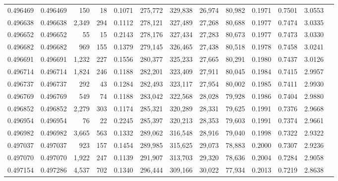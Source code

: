 \begin{tabular}{rrrrrrrrrrrrr}
0.496469 & 0.496469 &   150 &    18 &                                     0.1071 & 275,772 & 329,838 &  26,974 &  80,982 & 0.1971 & 0.7501 & 3.0553 \\
0.496638 & 0.496638 & 2,349 &   294 &                                     0.1112 & 278,121 & 327,489 &  27,268 &  80,688 & 0.1977 & 0.7474 & 3.0335 \\
0.496652 & 0.496652 &    55 &    15 &                                     0.2143 & 278,176 & 327,434 &  27,283 &  80,673 & 0.1977 & 0.7473 & 3.0330 \\
0.496682 & 0.496682 &   969 &   155 &                                     0.1379 & 279,145 & 326,465 &  27,438 &  80,518 & 0.1978 & 0.7458 & 3.0241 \\
0.496691 & 0.496691 & 1,232 &   227 &                                     0.1556 & 280,377 & 325,233 &  27,665 &  80,291 & 0.1980 & 0.7437 & 3.0126 \\
0.496714 & 0.496714 & 1,824 &   246 &                                     0.1188 & 282,201 & 323,409 &  27,911 &  80,045 & 0.1984 & 0.7415 & 2.9957 \\
0.496737 & 0.496737 &   292 &    43 &                                     0.1284 & 282,493 & 323,117 &  27,954 &  80,002 & 0.1985 & 0.7411 & 2.9930 \\
0.496769 & 0.496769 &   549 &    74 &                                     0.1188 & 283,042 & 322,568 &  28,028 &  79,928 & 0.1986 & 0.7404 & 2.9880 \\
0.496852 & 0.496852 & 2,279 &   303 &                                     0.1174 & 285,321 & 320,289 &  28,331 &  79,625 & 0.1991 & 0.7376 & 2.9668 \\
0.496954 & 0.496954 &    76 &    22 &                                     0.2245 & 285,397 & 320,213 &  28,353 &  79,603 & 0.1991 & 0.7374 & 2.9661 \\
0.496982 & 0.496982 & 3,665 &   563 &                                     0.1332 & 289,062 & 316,548 &  28,916 &  79,040 & 0.1998 & 0.7322 & 2.9322 \\
0.497037 & 0.497037 &   923 &   157 &                                     0.1454 & 289,985 & 315,625 &  29,073 &  78,883 & 0.2000 & 0.7307 & 2.9236 \\
0.497070 & 0.497070 & 1,922 &   247 &                                     0.1139 & 291,907 & 313,703 &  29,320 &  78,636 & 0.2004 & 0.7284 & 2.9058 \\
0.497154 & 0.497286 & 4,537 &   702 &                                     0.1340 & 296,444 & 309,166 &  30,022 &  77,934 & 0.2013 & 0.7219 & 2.8638 \\

\end{tabular}
